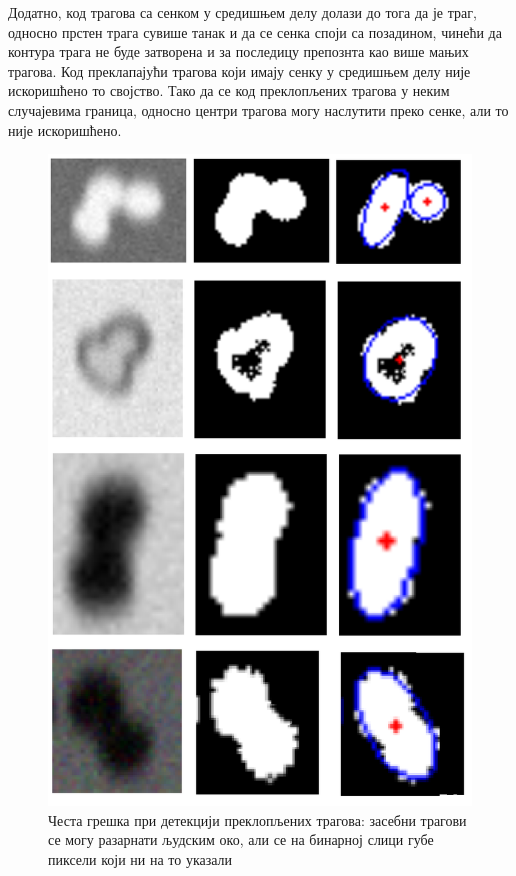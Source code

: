 \documentclass[12pt,a4paper,serbian,oneside]{book}
\begin{document}
Додатно, код трагова са сенком у средишњем делу долази до тога да је траг, односно прстен трага сувише танак и да се сенка споји са позадином, чинећи да контура трага не буде затворена и за последицу препознта као више мањих трагова. Код преклапајући трагова који имају сенку у средишњем делу није искоришћено то својство. Тако да се код преклопљених трагова у неким случајевима граница, односно центри трагова могу наслутити преко сенке, али то није искоришћено.

\begin{figure}[H]
\begin{center}
\includegraphics[width=150mm]{images/error01.png}
\end{center}
\caption{Честа грешка при детекцији преклопљених трагова: засебни трагови се могу разарнати људским око, али се на бинарној слици губе пиксели који ни на то указали}
\label{fig:error_overlapped}
\end{figure}
\end{document}
